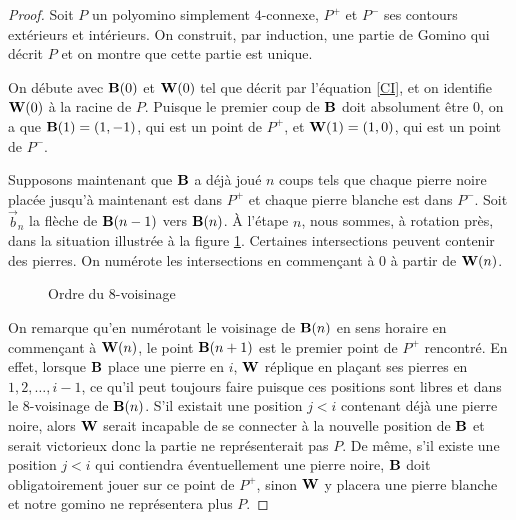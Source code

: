 \begin{proof}
Soit $P$ un polyomino simplement $4$-connexe, $P^+$ et $P^-$ ses contours extérieurs et intérieurs. On construit, par induction, une partie de Gomino qui décrit $P$ et on montre que cette partie est unique.

On débute avec $\mathbf{B}(0)$ et $\mathbf{W}(0)$ tel que décrit par l'équation \eqref{CI}, et on identifie $\mathbf{W}(0)$ à la racine de $P$. Puisque le premier coup de $\mathbf{B}$ doit absolument être $0$, on a que $\mathbf{B}(1)=(1,-1)$, qui est un point de $P^+$, et $\mathbf{W}(1)=(1,0)$, qui est un point de $P^-$.

Supposons maintenant que $\mathbf{B}$ a déjà joué $n$ coups tels que chaque pierre noire placée jusqu'à maintenant est dans $P^+$ et chaque pierre blanche est dans $P^-$. Soit $\vec{b}_n$ la flèche de $\mathbf{B}(n-1)$ vers $\mathbf{B}(n)$. À l'étape $n$, nous sommes, à rotation près, dans la situation illustrée à la figure \ref{fig:ordre}. Certaines intersections peuvent contenir des pierres. On numérote les intersections en commençant à $0$ à partir de $\mathbf{W}(n)$.

\begin{figure}[h!]
\centering
{}
\caption{Ordre du $8$-voisinage}
\label{fig:ordre}
\end{figure}

On remarque qu'en numérotant le voisinage de $\mathbf{B}(n)$ en sens horaire en commençant à $\mathbf{W}(n)$, le point $\mathbf{B}(n+1)$ est le premier point de $P^+$ rencontré. En effet, lorsque $\mathbf{B}$ place une pierre en $i$, $\mathbf{W}$ réplique en plaçant ses pierres en $1,2,\dots, i-1$, ce qu'il peut toujours faire puisque ces positions sont libres et dans le $8$-voisinage de $\mathbf{B}(n)$. S'il existait une position $j<i$ contenant déjà une pierre noire, alors $\mathbf{W}$ serait incapable de se connecter à la nouvelle position de $\mathbf{B}$ et serait victorieux donc la partie ne représenterait pas $P$. De même, s'il existe une position $j<i$ qui contiendra éventuellement une pierre noire, $\mathbf{B}$ doit obligatoirement jouer sur ce point de $P^+$, sinon $\mathbf{W}$ y placera une pierre blanche et notre gomino ne représentera plus $P$.
\end{proof}

